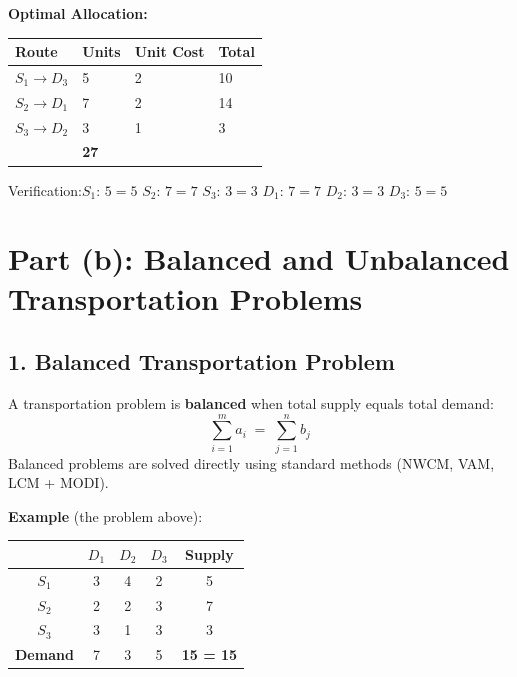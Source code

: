 \documentclass[12pt]{article}
\begin{document}
\begin{answerbox}
\textbf{Optimal Allocation:}
\begin{center}
\renewcommand{\arraystretch}{1.35}
\begin{tabular}{|C{2.8cm}|C{2.4cm}|C{2cm}|C{2.6cm}|}
  \hline
  \textbf{Route} & \textbf{Units} & \textbf{Unit Cost} & \textbf{Total} \\
  \hline
  $S_1 \to D_3$ & 5 & 2 & 10 \\
  \hline
  $S_2 \to D_1$ & 7 & 2 & 14 \\
  \hline
  $S_3 \to D_2$ & 3 & 1 & 3 \\
  \hline
   & \Large\textbf{27} \\
  \hline
\end{tabular}
\end{center}
\vspace{4pt}
Verification:\quad $S_1$: $5=5$\checkmark\; $S_2$: $7=7$\checkmark\; $S_3$: $3=3$\checkmark\quad
$D_1$: $7=7$\checkmark\; $D_2$: $3=3$\checkmark\; $D_3$: $5=5$\checkmark
\end{answerbox}

\section{Part (b): Balanced and Unbalanced Transportation Problems}

\subsection*{1. Balanced Transportation Problem}

\begin{defbox}
A transportation problem is \textbf{balanced} when total supply equals total demand:
\[
  \sum_{i=1}^{m} a_i \;=\; \sum_{j=1}^{n} b_j
\]
Balanced problems are solved directly using standard methods (NWCM, VAM, LCM + MODI).
\end{defbox}

\textbf{Example} (the problem above):

\begin{center}
\renewcommand{\arraystretch}{1.3}
\begin{tabular}{|c|c|c|c|c|}
  \hline
  \rowcolor{primary}
  {\color{white}} & {\color{white}$D_1$} & {\color{white}$D_2$} & {\color{white}$D_3$} & {\color{white}Supply} \\
  \hline
  \rowcolor{lightbg!50} $S_1$ & 3 & 4 & 2 & 5 \\
  \hline
  $S_2$ & 2 & 2 & 3 & 7 \\
  \hline
  \rowcolor{lightbg!50} $S_3$ & 3 & 1 & 3 & 3 \\
  \hline
  \rowcolor{accent!20}\textbf{Demand} & 7 & 3 & 5 & \textbf{15 = 15} \\
  \hline
\end{tabular}
\end{center}
\end{document}
